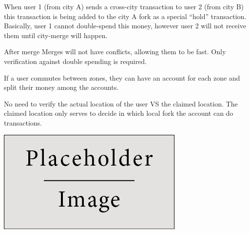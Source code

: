 \documentclass[portrait,a0paper,fontscale=0.285]{baposter} %
\begin{document}
\begin{poster}
{\begin{multicols}{2}
When user 1 (from city A)  sends a cross-city transaction to user 2 (from city B) this transaction is being added to the city A fork as a special  “hold” transaction. Basically, user 1 cannot double-spend this money, however user 2 will not receive them until city-merge will happen.

After merge 
Merges will not have conflicts, allowing them to be fast.  Only verification against double spending is required.

If a user commutes between zones, they can have an account for each zone and split their money among the accounts.

No need to verify the actual location of the user VS the claimed location.  The claimed location only serves to decide in which local fork the account can do transactions.

\begin{center}
\includegraphics[width=0.8\linewidth]{placeholder}
\end{center}

\end{multicols}
}


\end{poster}
\end{document}
